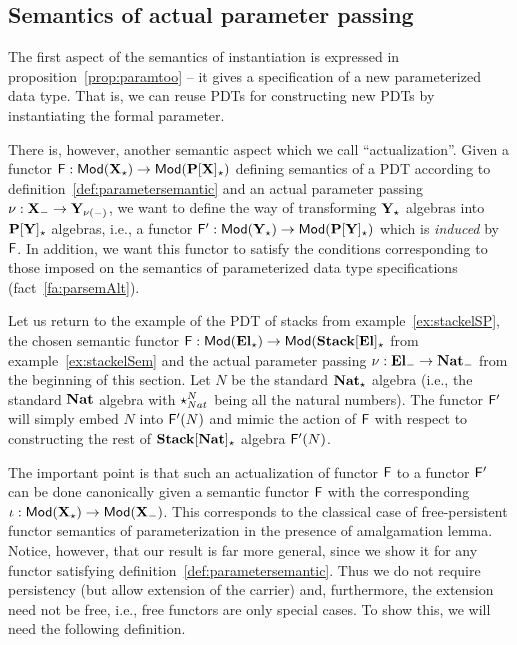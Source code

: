 \subsection{Semantics of actual parameter passing}\label{sub:appsem}
The first aspect of the semantics of instantiation is expressed in
proposition~\ref{prop:paramtoo} -- it gives a specification of a new parameterized
data type. That is, we can reuse PDTs for constructing new PDTs by 
instantiating the formal parameter. 

There is, however, another semantic aspect which we call ``actualization''.
Given a functor ${\sf {F}}:{\sf {Mod}}({\bf X_\star})\to {\sf {Mod}}({\bf P[X]_\star})$
defining semantics of a PDT according to
definition~\ref{def:parametersemantic} and an actual parameter passing
$\nu:{\bf X_-}\to{\bf Y_{\nu(-)}}$, we want to define the way of
transforming ${\bf Y_\star}$ algebras into ${\bf P[Y]_\star}$ algebras, i.e.,
a functor ${\sf {F}}':{\sf {Mod}}({\bf Y_\star})\to {\sf {Mod}}({\bf P[Y]_\star})$ which is
{\em induced} by ${\sf {F}}$. In
addition, we want this functor to satisfy the conditions corresponding to
those imposed on the semantics of parameterized data type specifications (fact~\ref{fa:parsemAlt}).

Let us return to the example of the PDT of stacks
from example~\ref{ex:stackelSP}, the chosen semantic functor
${\sf {F}}:{\sf {Mod}}({\bf El_\star})\to{\sf {Mod}}({\bf Stack[El]_\star}$ from 
example~\ref{ex:stackelSem} and the actual parameter passing $\nu:{\bf El_-}\to{\bf Nat_-}$ from the
beginning of this section. Let $N$ be the standard ${\bf Nat_\star}$
algebra (i.e., the standard ${\bf Nat}$ algebra with $\star_{Nat}^N$ being
all the natural numbers). The functor ${\sf {F}}'$ will simply embed $N$ into
${\sf {F}}'(N)$ and mimic the action of ${\sf {F}}$ with respect to constructing
the rest of ${\bf Stack[Nat]_\star}$ algebra ${\sf {F}}'(N)$. 

The important point is that such an actualization of functor ${\sf {F}}$ 
to a functor ${\sf {F}}'$ can be done canonically given a semantic functor
${\sf {F}}$ with the corresponding
$\iota:{\sf {Mod}}({\bf X_\star})\to{\sf {Mod}}({\bf X_-})$.
This corresponds to the classical case of free-persistent functor semantics of
parameterization in the presence of amalgamation lemma. Notice, however, that
our result is far more general, since we show it for any functor satisfying
definition~\ref{def:parametersemantic}. Thus we 
do not require persistency (but
allow extension of the carrier) and, furthermore, the extension need not be
free, i.e., free functors are only special cases. 
To show this, we will need the following definition.

